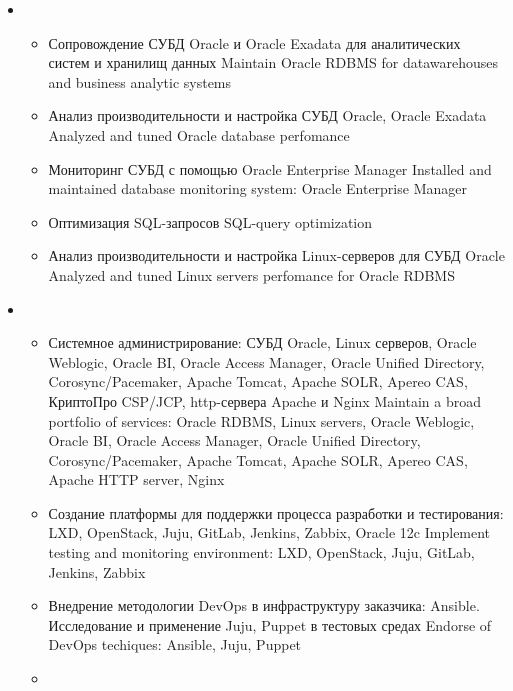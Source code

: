 \documentclass[11pt,a4paper,sans, russian]{moderncv}        %
\begin{document}
{\begin{itemize}
\begin{itemize}
		\end{itemize}
	\item {}
		\begin{itemize}
			\item {}
				{Сопровождение СУБД Oracle и Oracle Exadata для аналитических систем и хранилищ данных}
				{Maintain Oracle RDBMS for datawarehouses and business analytic systems}
			\item {}
				{Анализ производительности и настройка СУБД Oracle, Oracle Exadata}
				{Analyzed and tuned Oracle database perfomance}
			\item {}
				{Мониторинг СУБД с помощью Oracle Enterprise Manager}
				{Installed and maintained database monitoring system: Oracle Enterprise Manager}
			\item {}
				{Оптимизация SQL-запросов}
				{SQL-query optimization}
			\item {}
				{Анализ производительности и настройка Linux-серверов для СУБД Oracle}
				{Analyzed and tuned Linux servers perfomance for Oracle RDBMS}
		\end{itemize}
	\item {}
		\begin{itemize}
			\item {}
				{Системное администрирование: СУБД Oracle, Linux серверов, Oracle Weblogic, Oracle BI, Oracle Access Manager, Oracle Unified Directory,
				Corosync/Pacemaker, Apache Tomcat, Apache SOLR, Apereo CAS, КриптоПро CSP/JCP, http-сервера Apache и Nginx}
				{Maintain a broad portfolio of services: Oracle RDBMS, Linux servers, Oracle Weblogic, Oracle BI, Oracle Access Manager, Oracle Unified Directory, Corosync/Pacemaker, Apache Tomcat, Apache SOLR, Apereo CAS, Apache HTTP server, Nginx}
			\item {}
				{Создание платформы для поддержки процесса разработки и тестирования: LXD, OpenStack, Juju, GitLab, Jenkins, Zabbix, Oracle 12c}
				{Implement testing and monitoring environment: LXD, OpenStack, Juju, GitLab, Jenkins, Zabbix}
			\item {}
				{Внедрение методологии DevOps в инфраструктуру заказчика: Ansible. Исследование и применение Juju, Puppet в тестовых средах}
				{Endorse of DevOps techiques: Ansible, Juju, Puppet}
			\item {}

\end{itemize}
\end{itemize}}
\end{document}
